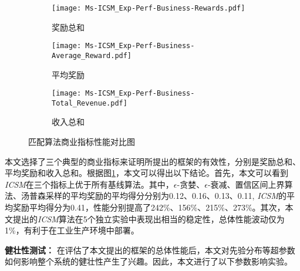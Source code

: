 \begin{figure}[!htb]
    \centering
    \begin{subfigure}[t]{0.49\linewidth}
	    	\captionsetup{justification=centering} %
	        \begin{minipage}[b]{1\linewidth}
		        \texttt{[image: Ms-ICSM\_Exp-Perf-Business-Rewards.pdf]}
		         \caption{奖励总和}
		        \end{minipage}
	    \end{subfigure}
    \begin{subfigure}[t]{0.49\linewidth}
	    \captionsetup{justification=centering} %
	        \begin{minipage}[b]{1\linewidth}
		        \texttt{[image: Ms-ICSM\_Exp-Perf-Business-Average\_Reward.pdf]}
		        \caption{平均奖励}
		        \end{minipage}
	    \end{subfigure}
    \begin{subfigure}[t]{0.8\linewidth}
	    	\captionsetup{justification=centering} %
	        \begin{minipage}[b]{1\linewidth}
		        \texttt{[image: Ms-ICSM\_Exp-Perf-Business-Total\_Revenue.pdf]}
		        \caption{收入总和}
		        \end{minipage}
	    \end{subfigure}
    \caption{匹配算法商业指标性能对比图}
    \label{Fig:Exp-Perf-Business}
\end{figure}


本文选择了三个典型的商业指标来证明所提出的框架的有效性，分别是奖励总和、平均奖励和收入总和。根据图\ref{Fig:Exp-Perf-Business}，本文可以得出以下结论。首先，本文可以看到\emph{ICSM}在三个指标上优于所有基线算法。其中，$\epsilon$-贪婪、$\epsilon$-衰减、置信区间上界算法、汤普森采样的平均奖励的平均得分分别为0.12、0.16、0.13、0.11, \emph{ICSM}的平均奖励平均得分为0.41，性能分别提高了242\%、156\%、215\%、273\%。其次，本文提出的\emph{ICSM}算法在5个独立实验中表现出相当的稳定性，总体性能波动仅为1\%，有利于在工业生产环境中部署。

\textbf{健壮性测试：}
在评估了本文提出的框架的总体性能后，本文对先验分布等超参数如何影响整个系统的健壮性产生了兴趣。因此，本文进行了以下参数影响实验。



